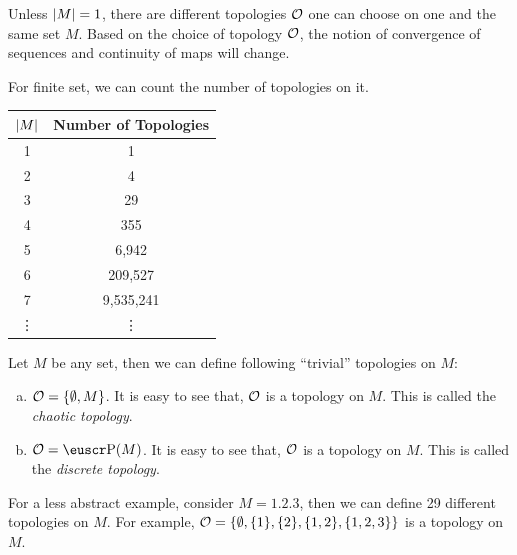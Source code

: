 \begin{remark}
	Unless \(\abs{M} = 1\), there are different topologies \(\mathcal{O}\) one can choose on one and the same set \(M\). Based on the choice of topology \(\mathcal{O}\), the notion of convergence of sequences and continuity of maps will change.
\end{remark}
For finite set, we can count the number of topologies on it.
\begin{table}[H]
	\centering
	\begin{tabular}{c|c}
		\toprule
		\(\abs{M}\) & Number of Topologies \\
		\midrule
		1           & 1                    \\
		2           & 4                    \\
		3           & 29                   \\
		4           & 355                  \\
		5           & 6,942                \\
		6           & 209,527              \\
		7           & 9,535,241            \\
		\vdots      & \vdots               \\
		\bottomrule
	\end{tabular}
\end{table}

\begin{example}
	Let \(M\) be any set, then we can define following ``trivial'' topologies on \(M\):
	\begin{enumerate}[(a)]
		\item \(\mathcal{O} = \qty{\emptyset, M}\). It is easy to see that, \(\mathcal{O}\) is a topology on \(M\). This is called the \emph{chaotic topology}.

		\item \(\CO = \powerset(M)\). It is easy to see that, \(\mathcal{O}\) is a topology on \(M\). This is called the \emph{discrete topology}.
	\end{enumerate}
\end{example}
For a less abstract example, consider \(M = \qty{1, 2, 3}\), then we can define 29 different topologies on \(M\). For example, \(\mathcal{O} = \qty{\emptyset, \qty{1}, \qty{2}, \qty{1, 2}, \qty{1, 2, 3}}\) is a topology on \(M\).

